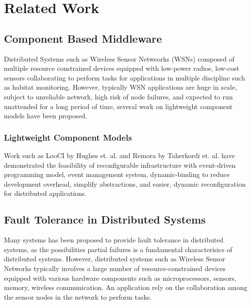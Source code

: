 \chapter{Related Work}
\label{c:intro}

\section{Component Based Middleware}

Distributed Systems such as Wireless Sensor Netweorks (WSNs) composed of
multiple resource constrained devices equipped with low-power radios, low-cost
sensors collaborating to perform tasks for applications in multiple discipline
such as habitat monitoring. However, typically WSN applications are huge in
scale, subject to unreliable network, high risk of node failures, and expected
to run unattended for a long period of time, several work on lightweight component
models have been proposed\cite{Costa2007}\cite{Gay2003}\cite{Coulson2008}.

\subsection{Lightweight Component Models}

Work such as LooCI by Hughes et. al.\cite{Hughes2012} and Remora by Taherkordi
et. al.\cite{Taherkordi2010a} have demonstrated the feasibility of
reconfigurable infrastructure with event-driven programming model, event
management system, dynamic-binding to reduce development overhead, simplify
abstractions, and easier, dynamic reconfiguration for distributed applications.

\section{Fault Tolerance in Distributed Systems}

Many systems has been proposed to provide fault tolerance in distributed
systems, as the possibilities partial failures is a fundamental characterisics
of distributed systems.
However, distributed systems such as Wireless Sensor Networks typically
involves a large number of resource-constrained devices equipped with various
hardware components such as microprocessors, sensors, memory, wireless
communication. An application rely on the collaboration among the sensor nodes in
the network to perform tasks.


